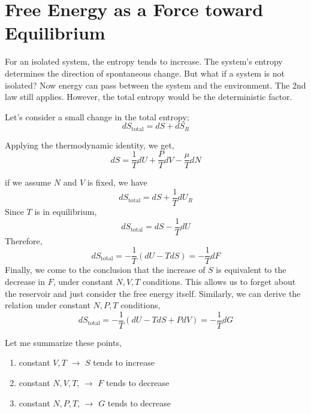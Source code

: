 
\section{Free Energy as a Force toward Equilibrium}
For an isolated system, the entropy tends to increase. The system's entropy determines the direction of spontaneous change. 
But what if a system is not isolated? Now energy can pass between the system and the environment. The 2nd law still applies.
However, the total entropy would be the deterministic factor.

Let's consider a small change in the total entropy;
\begin{equation} dS_\text{total} = dS + dS_R \end{equation}

Applying the thermodynamic identity, we get,
\begin{equation} dS = \frac{1}{T}dU + \frac{P}{T}dV - \frac{\mu}{T}dN \end{equation}

if we assume $N$ and $V$ is fixed, we have
\begin{equation} dS_\text{total} = dS + \frac{1}{T}dU_R \end{equation}
Since $T$ is in equilibrium,
\begin{equation} dS_\text{total} = dS - \frac{1}{T}dU \end{equation}
Therefore,
\begin{equation} dS_\text{total} = -\frac{1}{T}(dU-TdS) = -\frac{1}{T}dF \end{equation}
Finally, we come to the conclusion that the increase of $S$ is equivalent to the decrease in $F$, under constant $N, V, T$ conditions.
This allows us to forget about the reservoir and just consider the free energy itself.
Similarly, we can derive the relation under constant $N, P, T$ conditions,
\begin{equation} dS_\text{total} = -\frac{1}{T}(dU-TdS+PdV) = -\frac{1}{T}dG \end{equation}

Let me summarize these points,
\begin{enumerate}
\item constant $V, T$ $\rightarrow$ $S$ tends to increase
\item constant $N, V, T$, $\rightarrow$ $F$ tends to decrease
\item constant $N, P, T$, $\rightarrow$ $G$ tends to decrease
\end{enumerate}

